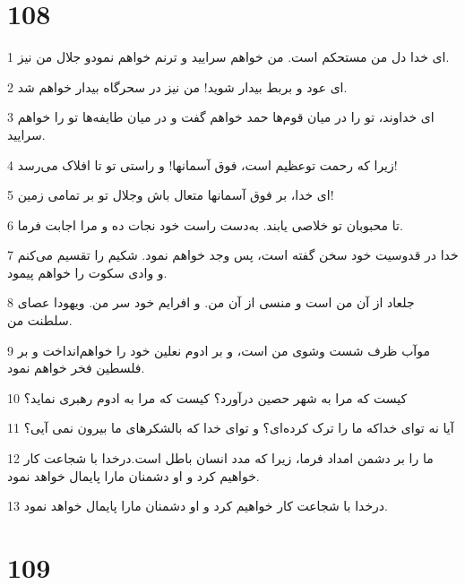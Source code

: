\chapter{108}

\par 1 ای خدا دل من مستحکم است. من خواهم سرایید و ترنم خواهم نمودو جلال من نیز.
\par 2 ‌ای عود و بربط بیدار شوید! من نیز در سحرگاه بیدار خواهم شد.
\par 3 ‌ای خداوند، تو را در میان قوم‌ها حمد خواهم گفت و در میان طایفه‌ها تو را خواهم سرایید.
\par 4 زیرا که رحمت توعظیم است، فوق آسمانها! و راستی تو تا افلاک می‌رسد!
\par 5 ‌ای خدا، بر فوق آسمانها متعال باش وجلال تو بر تمامی زمین!
\par 6 تا محبوبان تو خلاصی یابند. به‌دست راست خود نجات ده و مرا اجابت فرما.
\par 7 خدا در قدوسیت خود سخن گفته است، پس وجد خواهم نمود. شکیم را تقسیم می‌کنم و وادی سکوت را خواهم پیمود.
\par 8 جلعاد از آن من است و منسی از آن من. و افرایم خود سر من. ویهودا عصای سلطنت من.
\par 9 موآب ظرف شست وشوی من است، و بر ادوم نعلین خود را خواهم‌انداخت و بر فلسطین فخر خواهم نمود.
\par 10 کیست که مرا به شهر حصین درآورد؟ کیست که مرا به ادوم رهبری نماید؟
\par 11 آیا نه تو‌ای خداکه ما را ترک کرده‌ای؟ و تو‌ای خدا که بالشکرهای ما بیرون نمی آیی؟
\par 12 ما را بر دشمن امداد فرما، زیرا که مدد انسان باطل است.درخدا با شجاعت کار خواهیم کرد و او دشمنان مارا پایمال خواهد نمود.
\par 13 درخدا با شجاعت کار خواهیم کرد و او دشمنان مارا پایمال خواهد نمود.
 
\chapter{109}


